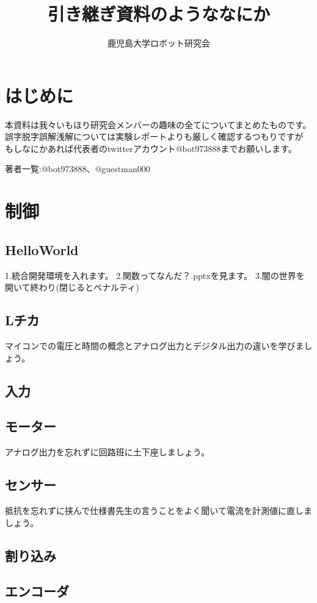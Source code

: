\documentclass{jarticle}
\begin{document}
\title{引き継ぎ資料のようななにか}
\author{鹿児島大学ロボット研究会}

\maketitle

\tableofcontents
\clearpage

\section{はじめに}
本資料は我々いもほり研究会メンバーの趣味の全てについてまとめたものです。
誤字脱字誤解浅解については実験レポートよりも厳しく確認するつもりですが
もしなにかあれば代表者のtwitterアカウント@bot973888までお願いします。

著者一覧:@bot973888、@guestman000
\clearpage

\section{制御}
   \subsection{HelloWorld}
      1.統合開発環境を入れます。
      2.関数ってなんだ？.pptxを見ます。
      3.闇の世界を開いて終わり(閉じるとペナルティ)
   \subsection{Lチカ}
      マイコンでの電圧と時間の概念とアナログ出力とデジタル出力の違いを学びましょう。
   \subsection{入力}
   \subsection{モーター}
      アナログ出力を忘れずに回路班に土下座しましょう。
   \subsection{センサー}
      抵抗を忘れずに挟んで仕様書先生の言うことをよく聞いて電流を計測値に直しましょう。
   \subsection{割り込み}
   \subsection{エンコーダ}
\end{document}
